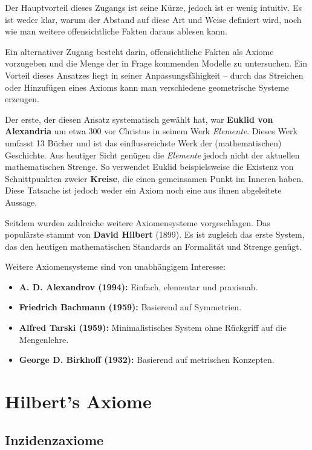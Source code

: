 \documentclass[a4paper,12pt]{article}
\theoremstyle{break}
\begin{document}
Der Hauptvorteil dieses Zugangs ist seine Kürze, jedoch ist er wenig intuitiv. Es ist weder klar, warum der Abstand auf diese Art und Weise definiert wird, noch wie man weitere offensichtliche Fakten daraus ablesen kann. 

Ein alternativer Zugang besteht darin, offensichtliche Fakten als Axiome vorzugeben und die Menge der in Frage kommenden Modelle zu untersuchen. Ein Vorteil dieses Ansatzes liegt in seiner Anpassungsfähigkeit – durch das Streichen oder Hinzufügen eines Axioms kann man verschiedene geometrische Systeme erzeugen. 

Der erste, der diesen Ansatz systematisch gewählt hat, war \textbf{Euklid von Alexandria} um etwa 300 vor Christus in seinem Werk \textit{Elemente}. Dieses Werk umfasst 13 Bücher und ist das einflussreichste Werk der (mathematischen) Geschichte. Aus heutiger Sicht genügen die \textit{Elemente} jedoch nicht der aktuellen mathematischen Strenge. So verwendet Euklid beispielsweise die Existenz von Schnittpunkten zweier \textbf{Kreise}, die einen gemeinsamen Punkt im Inneren haben. Diese Tatsache ist jedoch weder ein Axiom noch eine aus ihnen abgeleitete Aussage. 

Seitdem wurden zahlreiche weitere Axiomensysteme vorgeschlagen. Das populärste stammt von \textbf{David Hilbert} (1899). Es ist zugleich das erste System, das den heutigen mathematischen Standards an Formalität und Strenge genügt. 

Weitere Axiomensysteme sind von unabhängigem Interesse:
\begin{itemize}
    \item \textbf{A. D. Alexandrov (1994):} Einfach, elementar und praxisnah.
    \item \textbf{Friedrich Bachmann (1959):} Basierend auf Symmetrien.
    \item \textbf{Alfred Tarski (1959):} Minimalistisches System ohne Rückgriff auf die Mengenlehre.
    \item \textbf{George D. Birkhoff (1932):} Basierend auf metrischen Konzepten.
\end{itemize}

\section{Hilbert's Axiome}

\subsection{Inzidenzaxiome}
\end{document}
